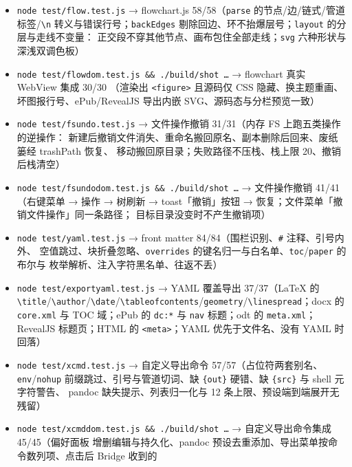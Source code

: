 \documentclass[11pt,a4paper]{ctexart}
\begin{document}
\begin{itemize}
\texttt{\#\#\#Header} 两档差异、\texttt{1. aaa} 后接 2/3 空格、\texttt{10. aaa} 后接 2/4 空格、空行后同级项
另起一块；列表续行与子列表按内容列判定；两档都验 \texttt{serialize(parse(src)) === src}）
\item \texttt{node test/flow.test.js} → flowchart.js 58/58（\texttt{parse} 的节点/边/链式/管道标签/\texttt{\textbackslash{}n}
转义与错误行号；\texttt{backEdges} 剔除回边、环不抬爆层号；\texttt{layout} 的分层与走线不变量：
正交段不穿其他节点、画布包住全部走线；\texttt{svg} 六种形状与深浅双调色板）
\item \texttt{node test/flowdom.test.js \&\& ./build/shot …} → flowchart 真实 WebView 集成 30/30
（渲染出 \texttt{\textless{}figure\textgreater{}} 且源码仅 CSS 隐藏、换主题重画、坏图报行号、ePub/RevealJS
导出内嵌 SVG、源码态与分栏预览一致）
\item \texttt{node test/fsundo.test.js} → 文件操作撤销 31/31（内存 FS 上跑五类操作的逆操作：
新建后撤销文件消失、重命名搬回原名、副本删除后回来、废纸篓经 trashPath 恢复、
移动搬回原目录；失败路径不压栈、栈上限 20、撤销后栈清空）
\item \texttt{node test/fsundodom.test.js \&\& ./build/shot …} → 文件操作撤销 41/41（右键菜单
→ 操作 → 树刷新 → toast「撤销」按钮 → 恢复；文件菜单「撤销文件操作」同一条路径；
目标目录没变时不产生撤销项）
\item \texttt{node test/yaml.test.js} → front matter 84/84（围栏识别、\texttt{\#} 注释、引号内外、
空值跳过、块折叠忽略、\texttt{overrides} 的键名归一与白名单、\texttt{toc}/\texttt{paper} 的布尔与
枚举解析、注入字符黑名单、往返不丢）
\item \texttt{node test/exportyaml.test.js} → YAML 覆盖导出 37/37（LaTeX 的
\texttt{\textbackslash{}title}/\texttt{\textbackslash{}author}/\texttt{\textbackslash{}date}/\texttt{\textbackslash{}tableofcontents}/\texttt{geometry}/\texttt{\textbackslash{}linespread}；docx 的
\texttt{core.xml} 与 TOC 域；ePub 的 \texttt{dc:*} 与 \texttt{nav} 标题；odt 的 \texttt{meta.xml}；
RevealJS 标题页；HTML 的 \texttt{\textless{}meta\textgreater{}}；YAML 优先于文件名、没有 YAML 时回落）
\item \texttt{node test/xcmd.test.js} → 自定义导出命令 57/57（占位符两套别名、\texttt{env}/\texttt{nohup}
前缀跳过、引号与管道切词、缺 \texttt{\{out\}} 硬错、缺 \texttt{\{src\}} 与 shell 元字符警告、
pandoc 缺失提示、列表归一化与 12 条上限、预设端到端展开无残留）
\item \texttt{node test/xcmddom.test.js \&\& ./build/shot …} → 自定义导出命令集成 45/45（偏好面板
增删编辑与持久化、pandoc 预设去重添加、导出菜单按命令数列项、点击后 Bridge 收到的

\end{itemize}
\end{document}
